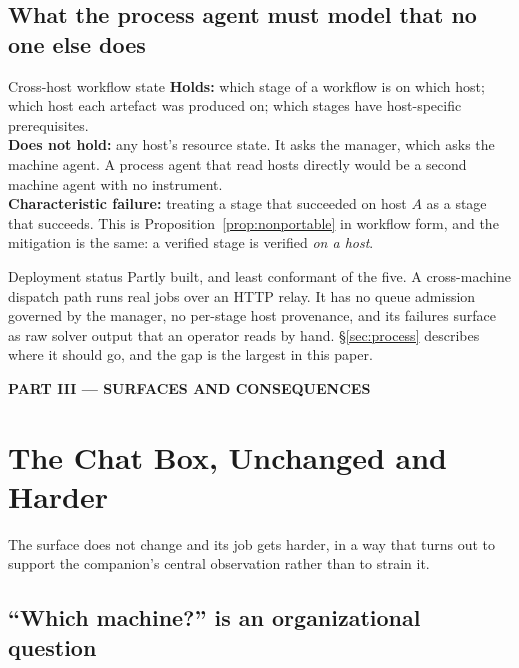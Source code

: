 \documentclass[11pt]{article}
\begin{document}
\subsection{What the process agent must model that no one else does}

\begin{specbox}{Cross-host workflow state}
\textbf{Holds:} which stage of a workflow is on which host; which host each artefact was produced on; which stages have host-specific prerequisites.\\[3pt]
\textbf{Does not hold:} any host's resource state. It asks the manager, which asks the machine agent. A process agent that read hosts directly would be a second machine agent with no instrument.\\[3pt]
\textbf{Characteristic failure:} treating a stage that succeeded on host $A$ as a stage that succeeds. This is Proposition~\ref{prop:nonportable} in workflow form, and the mitigation is the same: a verified stage is verified \emph{on a host}.
\end{specbox}

\begin{notebox}{Deployment status}
Partly built, and least conformant of the five. A cross-machine dispatch path runs real jobs over an HTTP relay. It has no queue admission governed by the manager, no per-stage host provenance, and its failures surface as raw solver output that an operator reads by hand. \S\ref{sec:process} describes where it should go, and the gap is the largest in this paper.
\end{notebox}

\newpage
\begin{center}\large\bfseries PART III --- SURFACES AND CONSEQUENCES\end{center}

\section{The Chat Box, Unchanged and Harder}
\label{sec:chatbox}

The surface does not change and its job gets harder, in a way that turns out to support the companion's central observation rather than to strain it.

\subsection{``Which machine?'' is an organizational question}
\end{document}
